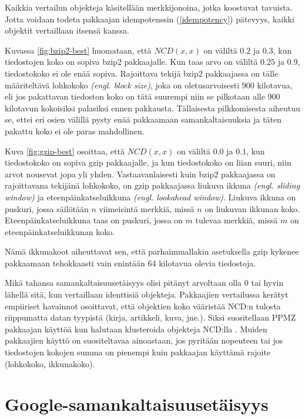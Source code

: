 \documentclass[12pt,finnish]{tktltiki2}
\theoremstyle{definition}
\theoremstyle{remark}
\newcommand{\engl}[1]{\emph{(engl. #1)}}
\begin{document}
      Kaikkia vertailun objekteja käsitellään merkkijonoina, jotka koostuvat tavuista.
      Jotta voidaan todeta pakkaajan idempotenssin (\ref{idempotency}) pätevyys, kaikki objektit vertaillaan itsensä kanssa.

      Kuvassa \ref{fig:bzip2-best} huomataan, että $NCD(x,x)$ on väliltä $0.2$ ja $0.3$, kun tiedostojen koko on sopiva bzip2 pakkaajalle. Kun taas arvo on väliltä $0.25$ ja $0.9$,  tiedostokoko ei ole enää sopiva.
      Rajoittava tekijä bzip2 pakkaajassa on tälle määriteltävä lohkokoko \engl{block size}, joka on oletusarvoisesti 900 kilotavua, eli jos pakattavan tiedoston koko on tätä suurempi niin se pilkotaan alle 900 kilotavun kokoisiksi palasiksi ennen pakkausta.
      Tällaisesta pilkkomisesta aiheutuu se, ettei eri osien välillä pysty enää pakkaamaan samankaltaisuuksia ja täten pakattu koko ei ole paras mahdollinen.

      Kuva \ref{fig:gzip-best} osoittaa, että $NCD(x,x)$ on väliltä $0.0$ ja $0.1$, kun tiedostokoko on sopiva gzip pakkaajalle, ja kun tiedostokoko on liian suuri, niin arvot nousevat jopa yli yhden.
      Vastaavanlaisesti kuin bzip2 pakkaajassa on rajoittavana tekijänä lohkokoko, on gzip pakkaajassa liukuva ikkuna \engl{sliding window} ja eteenpäinkatseluikkuna \engl{lookahead window}.
      Liukuva ikkuna on puskuri, jossa säilötään $n$ viimeisintä merkkiä, missä $n$ on liukuvan ikkunan koko.
      Eteenpäinkatseluikkuna taas on puskuri, jossa on $m$ tulevaa merkkiä, missä $m$ on eteenpäinkatseluikkunan koko.

      Nämä ikkunakoot aiheuttavat sen, että parhaimmallakin asetuksella gzip kykenee pakkaamaan tehokkaasti vain enintään 64 kilotavua olevia tiedostoja.

      Mikä tahansa samankaltaisuusetäisyys olisi pitänyt arvoltaan olla $0$ tai hyvin lähellä sitä, kun vertaillaan identtisiä objekteja.
      Pakkaajien vertailussa kerätyt empiiriset havainnot osoittavat, että objektien koko vääristää NCD:n tulosta riippumatta datan tyypistä (kirja, artikkeli, kuva, jne.).
      Siksi suositellaan PPMZ pakkaajan käyttöä kun halutaan klusteroida objekteja NCD:lla \cite{cebrian2005common}.
      Muiden pakkaajien käyttö on suositeltavaa ainoastaan, jos pyritään nopeuteen tai jos tiedostojen kokojen summa on pienempi kuin pakkaajan käyttämä rajoite (lohkokoko, ikkunakoko).


\section{Google-samankaltaisuusetäisyys} %
  \label{sec:google_samankaltaisuusetaisyys}
\end{document}
